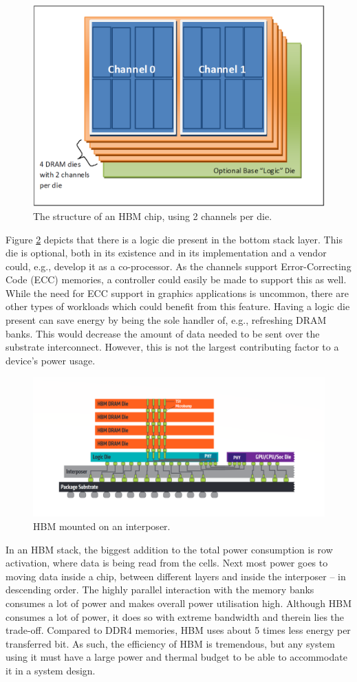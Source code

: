 \begin{figure}[!ht]
\centering
\includegraphics[width=0.75\linewidth]{figure/HBM_structure.PNG}
\caption{The structure of an HBM chip, using 2 channels per die.}
\label{HBM-structure}
\end{figure}

Figure \ref{HBM-mounted} depicts that there is a logic die present in the bottom stack layer. This die is optional, both in its existence and in its implementation and a vendor could, e.g., develop it as a co-processor. As the channels support Error-Correcting Code (ECC) memories, a controller could easily be made to support this as well. While the need for ECC support in graphics applications is uncommon, there are other types of workloads which could benefit from this feature. Having a logic die present can save energy by being the sole handler of, e.g., refreshing DRAM banks. This would decrease the amount of data needed to be sent over the substrate interconnect. However, this is not the largest contributing factor to a device's power usage. 
\bigskip

\begin{figure}[!ht]
\centering
\includegraphics[width=0.75\linewidth]{figure/HBM.png}
\caption{HBM mounted on an interposer.}
\label{HBM-mounted}
\end{figure}

In an HBM stack, the biggest addition to the total power consumption is row activation, where data is being read from the cells. Next most power goes to moving data inside a chip, between different layers and inside the interposer -- in descending order. The highly parallel interaction with the memory banks consumes a lot of power and makes overall power utilisation high. Although HBM consumes a lot of power, it does so with extreme bandwidth and therein lies the trade-off. Compared to DDR4 memories, HBM uses about 5 times less energy per transferred bit. As such, the efficiency of HBM is tremendous, but any system using it must have a large power and thermal budget to be able to accommodate it in a system design.
\bigskip

